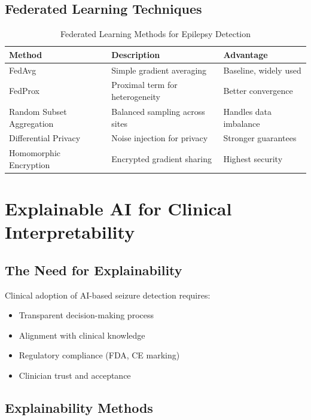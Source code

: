 \documentclass[12pt,a4paper]{article}
\begin{document}
\subsection{Federated Learning Techniques}

\begin{table}[H]
\centering
\caption{Federated Learning Methods for Epilepsy Detection}
\label{tab:federated}
\begin{tabular}{lp{4cm}p{4cm}}
\toprule
\textbf{Method} & \textbf{Description} & \textbf{Advantage} \\
\midrule
FedAvg & Simple gradient averaging & Baseline, widely used \\
FedProx & Proximal term for heterogeneity & Better convergence \\
Random Subset Aggregation & Balanced sampling across sites & Handles data imbalance \\
Differential Privacy & Noise injection for privacy & Stronger guarantees \\
Homomorphic Encryption & Encrypted gradient sharing & Highest security \\
\bottomrule
\end{tabular}
\end{table}

\section{Explainable AI for Clinical Interpretability}

\subsection{The Need for Explainability}

Clinical adoption of AI-based seizure detection requires:
\begin{itemize}
    \item Transparent decision-making process
    \item Alignment with clinical knowledge
    \item Regulatory compliance (FDA, CE marking)
    \item Clinician trust and acceptance
\end{itemize}

\subsection{Explainability Methods}
\end{document}
